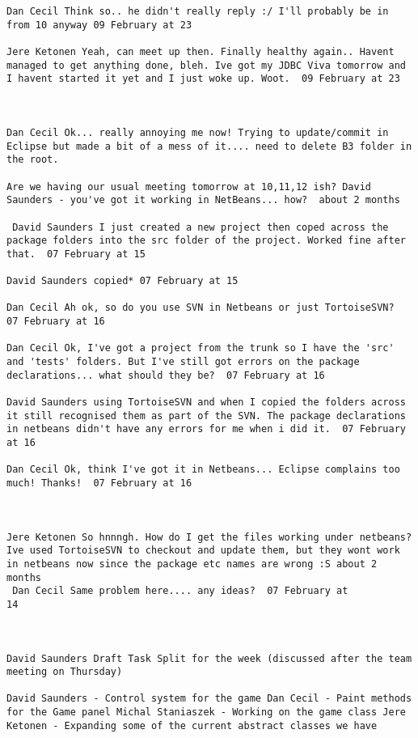\begin{verbatim}
Dan Cecil Think so.. he didn't really reply :/ I'll probably be in
from 10 anyway 09 February at 23

Jere Ketonen Yeah, can meet up then. Finally healthy again.. Havent
managed to get anything done, bleh. Ive got my JDBC Viva tomorrow and
I havent started it yet and I just woke up. Woot.  09 February at 23



Dan Cecil Ok... really annoying me now! Trying to update/commit in
Eclipse but made a bit of a mess of it.... need to delete B3 folder in
the root.

Are we having our usual meeting tomorrow at 10,11,12 ish? David
Saunders - you've got it working in NetBeans... how?  about 2 months

 David Saunders I just created a new project then coped across the
package folders into the src folder of the project. Worked fine after
that.  07 February at 15

David Saunders copied* 07 February at 15

Dan Cecil Ah ok, so do you use SVN in Netbeans or just TortoiseSVN?
07 February at 16

Dan Cecil Ok, I've got a project from the trunk so I have the 'src'
and 'tests' folders. But I've still got errors on the package
declarations... what should they be?  07 February at 16

David Saunders using TortoiseSVN and when I copied the folders across
it still recognised them as part of the SVN. The package declarations
in netbeans didn't have any errors for me when i did it.  07 February
at 16

Dan Cecil Ok, think I've got it in Netbeans... Eclipse complains too
much! Thanks!  07 February at 16



Jere Ketonen So hnnngh. How do I get the files working under netbeans?
Ive used TortoiseSVN to checkout and update them, but they wont work
in netbeans now since the package etc names are wrong :S about 2
months 
 Dan Cecil Same problem here.... any ideas?  07 February at
14



David Saunders Draft Task Split for the week (discussed after the team
meeting on Thursday)

David Saunders - Control system for the game Dan Cecil - Paint methods
for the Game panel Michal Staniaszek - Working on the game class Jere
Ketonen - Expanding some of the current abstract classes we have


\end{verbatim}
